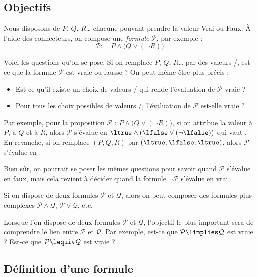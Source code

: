 \documentclass[11pt,class=report,crop=false]{standalone}
\begin{document}
\subsection{Objectifs}

Nous disposons de  $P$, $Q$, $R$\ldots{} chacune pouvant prendre la valeur Vrai ou Faux. À l'aide des connecteurs, on compose une \emph{formule} $\mathcal{P}$, par exemple :
\[
\mathcal{P} :  \quad P \land \big( Q \lor (\lnot R) \big)
\]

Voici les questions qu'on se pose.
Si on remplace $P$, $Q$, $R$\ldots{} par des valeurs \ltrue/\lfalse, est-ce que la formule $\mathcal{P}$ est vraie ou fausse ? On peut même être plus précis : 
\begin{itemize}
	\item Est-ce qu'il existe un choix de valeurs \ltrue/\lfalse{} qui rende l'évaluation de $\mathcal{P}$ vraie ?
	\item Pour tous les choix possibles de valeurs \ltrue/\lfalse, l'évaluation de $\mathcal{P}$ est-elle vraie ?
\end{itemize}


Par exemple, pour la proposition $\mathcal{P}$ : $P \land \big( Q \lor (\lnot R) \big)$, si on attribue la valeur \ltrue{} à $P$, \lfalse{} à $Q$ et \lfalse{} à $R$, alors $\mathcal{P}$ s'évalue en $\ltrue \land ( \lfalse \lor (\lnot \lfalse))$ qui vaut \ltrue.
En revanche, si on remplace $(P,Q,R)$ par $(\ltrue,\lfalse,\ltrue)$, alors $\mathcal{P}$ s'évalue en \lfalse.

Bien sûr, on pourrait se poser les mêmes questions pour savoir quand $\mathcal{P}$ s'évalue en faux, mais cela revient à décider quand la formule $\lnot \mathcal{P}$ s'évalue en vrai.

Si on dispose de deux formules $\mathcal{P}$ et $\mathcal{Q}$, alors on peut composer des formules plus complexes $\mathcal{P} \land \mathcal{Q}$, $\mathcal{P} \lor \mathcal{Q}$, etc.

Lorsque l'on dispose de deux formules $\mathcal{P}$ et $\mathcal{Q}$, l'objectif le plus important sera de comprendre le lien entre $\mathcal{P}$ et $\mathcal{Q}$. Par exemple, est-ce que $\mathcal{P} \limplies \mathcal{Q}$ est vraie ? Est-ce que $\mathcal{P} \lequiv \mathcal{Q}$ est vraie ?


\subsection{Définition d'une formule}
\end{document}

